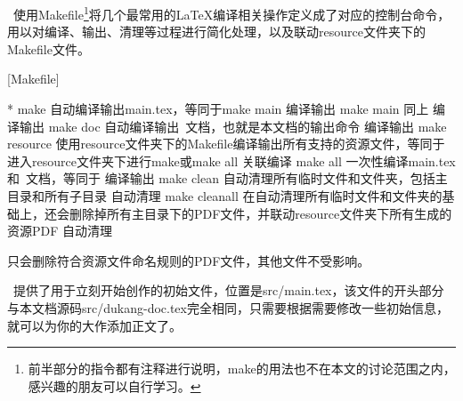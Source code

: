 \dk~使用Makefile\footnote{前半部分的指令都有注释进行说明，make的用法也不在本文的讨论范围之内，感兴趣的朋友可以自行学习。}将几个最常用的{\LaTeX}编译相关操作定义成了对应的控制台命令，用以对编译、输出、清理等过程进行简化处理，以及联动resource文件夹下的Makefile文件。

[Makefile]

\begin{cvhonors}*
  \cvhonor
  {make}
  {自动编译输出main.tex，等同于make main}
  {编译输出}
  \cvhonor
  {make main}
  {同上}
  {编译输出}
  \cvhonor
  {make doc}
  {自动编译输出\dk~文档，也就是本文档的输出命令}
  {编译输出}
  \cvhonor
  {make resource}
  {使用resource文件夹下的Makefile编译输出所有支持的资源文件，等同于进入resource文件夹下进行make或make all}
  {关联编译}
  \cvhonor
  {make all}
  {一次性编译main.tex和\dk~文档，等同于}
  {编译输出}
  \cvhonor
  {make clean}
  {自动清理所有临时文件和文件夹，包括主目录和所有子目录}
  {自动清理}
  \cvhonor
  {make cleanall}
  {在自动清理所有临时文件和文件夹的基础上，还会删除掉所有主目录下的PDF文件，并联动resource文件夹下所有生成的资源PDF}
  {自动清理}
\end{cvhonors}

\begin{dkcomment}
  只会删除符合资源文件命名规则的PDF文件，其他文件不受影响。
\end{dkcomment}

\dk~提供了用于立刻开始创作的初始文件，位置是src/main.tex，该文件的开头部分与本文档源码src/dukang-doc.tex完全相同，只需要根据需要修改一些初始信息，就可以为你的大作添加正文了。

\clearpage
